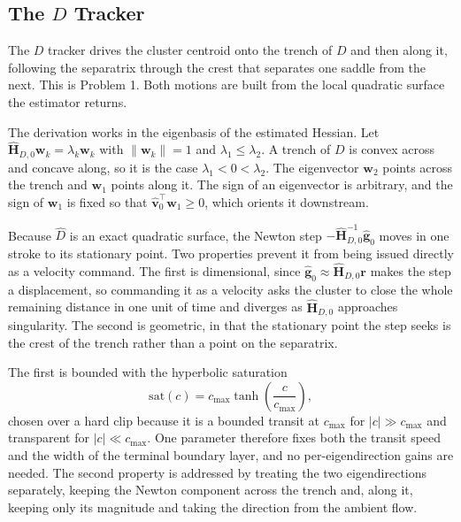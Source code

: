 \documentclass[lettersize,journal]{IEEEtran}
\begin{document}
\subsection{The $D$ Tracker}
\label{sec:sep_controller}

The $D$ tracker drives the cluster centroid onto the trench of $D$ and
then along it, following the separatrix through the crest that separates
one saddle from the next. This is Problem 1. Both motions are built from
the local quadratic surface the estimator returns.

The derivation works in the eigenbasis of the estimated Hessian. Let
$\hat{\mathbf{H}}_{D,0}\mathbf{w}_k = \lambda_k \mathbf{w}_k$ with
$\|\mathbf{w}_k\| = 1$ and $\lambda_1 \leq \lambda_2$. A trench of $D$ is
convex across and concave along, so it is the case
$\lambda_1 < 0 < \lambda_2$. The eigenvector $\mathbf{w}_2$ points across
the trench and $\mathbf{w}_1$ points along it. The sign of an eigenvector
is arbitrary, and the sign of $\mathbf{w}_1$ is fixed so that
$\hat{\mathbf{v}}_0^\top \mathbf{w}_1 \geq 0$, which orients it
downstream.

Because $\hat{D}$ is an exact quadratic surface, the Newton step
$-\hat{\mathbf{H}}_{D,0}^{-1}\hat{\mathbf{g}}_0$ moves in one stroke to
its stationary point. Two properties prevent it from being issued
directly as a velocity command. The first is dimensional, since
$\hat{\mathbf{g}}_0 \approx \hat{\mathbf{H}}_{D,0}\mathbf{r}$ makes the
step a displacement, so commanding it as a velocity asks the cluster to
close the whole remaining distance in one unit of time and diverges as
$\hat{\mathbf{H}}_{D,0}$ approaches singularity. The second is geometric,
in that the stationary point the step seeks is the crest of the trench
rather than a point on the separatrix.

The first is bounded with the hyperbolic saturation
\begin{equation}
    \mathrm{sat}(c) = c_{\max} \tanh\!\left(\frac{c}{c_{\max}}\right),
    \label{eq:sat}
\end{equation}
chosen over a hard clip because it is a bounded transit at $c_{\max}$ for
$|c| \gg c_{\max}$ and transparent for $|c| \ll c_{\max}$. One parameter
therefore fixes both the transit speed and the width of the terminal
boundary layer, and no per-eigendirection gains are needed. The second
property is addressed by treating the two eigendirections separately,
keeping the Newton component across the trench and, along it, keeping
only its magnitude and taking the direction from the ambient flow.
\end{document}

